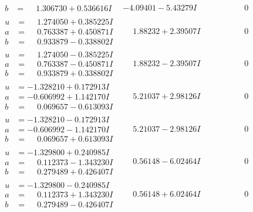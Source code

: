 \documentclass[1p]{elsarticle_modified}
\theoremstyle{definition}
\begin{document}
$$\begin{array}{c|c|c}
\begin{aligned}
b &= \phantom{-}1.306730 + 0.536616 I\end{aligned}
 & -4.09401 - 5.43279 I & \phantom{-0.000000 } 0 \\ \hline\begin{aligned}
u &= \phantom{-}1.274050 + 0.385225 I \\
a &= \phantom{-}0.763387 + 0.450871 I \\
b &= \phantom{-}0.933879 - 0.338802 I\end{aligned}
 & \phantom{-}1.88232 + 2.39507 I & \phantom{-0.000000 } 0 \\ \hline\begin{aligned}
u &= \phantom{-}1.274050 - 0.385225 I \\
a &= \phantom{-}0.763387 - 0.450871 I \\
b &= \phantom{-}0.933879 + 0.338802 I\end{aligned}
 & \phantom{-}1.88232 - 2.39507 I & \phantom{-0.000000 } 0 \\ \hline\begin{aligned}
u &= -1.328210 + 0.172913 I \\
a &= -0.606992 + 1.142170 I \\
b &= \phantom{-}0.069657 - 0.613093 I\end{aligned}
 & \phantom{-}5.21037 + 2.98126 I & \phantom{-0.000000 } 0 \\ \hline\begin{aligned}
u &= -1.328210 - 0.172913 I \\
a &= -0.606992 - 1.142170 I \\
b &= \phantom{-}0.069657 + 0.613093 I\end{aligned}
 & \phantom{-}5.21037 - 2.98126 I & \phantom{-0.000000 } 0 \\ \hline\begin{aligned}
u &= -1.329800 + 0.240985 I \\
a &= \phantom{-}0.112373 - 1.343230 I \\
b &= \phantom{-}0.279489 + 0.426407 I\end{aligned}
 & \phantom{-}0.56148 - 6.02464 I & \phantom{-0.000000 } 0 \\ \hline\begin{aligned}
u &= -1.329800 - 0.240985 I \\
a &= \phantom{-}0.112373 + 1.343230 I \\
b &= \phantom{-}0.279489 - 0.426407 I\end{aligned}
 & \phantom{-}0.56148 + 6.02464 I & \phantom{-0.000000 } 0\\

\end{array}$$
\end{document}
